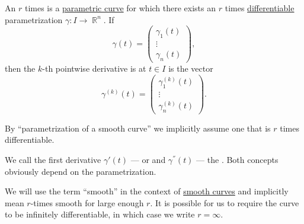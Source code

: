 \begin{definition}\label{def:smooth_curve}
  An \( r \) times  is a \hyperref[def:parametric_curve]{parametric curve} for which there exists an \( r \) times \hyperref[def:differentiability/frechet]{differentiable} parametrization \( \gamma: I \to \BbbR^n \). If
  \begin{equation*}
    \gamma(t) = \begin{pmatrix}
      \gamma_1(t) \\
      \vdots \\
      \gamma_n(t)
    \end{pmatrix},
  \end{equation*}
  then the \( k \)-th pointwise derivative is at \( t \in I \) is the vector
  \begin{equation*}
    \gamma^{(k)}(t) = \begin{pmatrix}
      \gamma_1^{(k)}(t) \\
      \vdots \\
      \gamma_n^{(k)}(t)
    \end{pmatrix}.
  \end{equation*}

  By \enquote{parametrization of a smooth curve} we implicitly assume one that is \( r \) times differentiable.

  We call the first derivative \( \gamma'(t) \) ---  or  and \( \gamma^\dprime(t) \) --- the . Both concepts obviously depend on the parametrization.
\end{definition}

\begin{remark}\label{rem:smooth_curve}
  We will use the term \enquote{smooth} in the context of \hyperref[def:smooth_curve]{smooth curves} and implicitly mean \( r \)-times smooth for large enough \( r \). It is possible for us to require the curve to be infinitely differentiable, in which case we write \( r = \infty \).
\end{remark}

